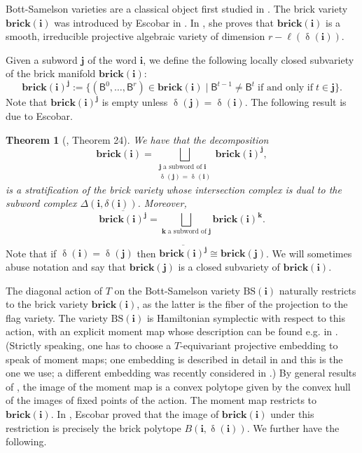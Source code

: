 \documentclass[a4paper, 11pt]{amsart}
\newcommand{\brick}{\mathbf{brick}}
\newcommand{\flag}[1]{\mathsf{B}^{#1}}
\newcommand{\word}[1]{\mathbf{#1}}
\DeclareMathOperator{\dem}{\delta}
\newcommand{\BS}{\mathrm{BS}}
\newtheorem{theorem}{Theorem}[section]
\theoremstyle{definition}
\begin{document}
Bott-Samelson varieties are a classical object first studied in \cite{BottSamelson}. The brick variety $\brick(\word{i})$ was introduced by Escobar in \cite[Definition 19]{escobar}. In \cite[Theorem 20]{escobar}, she proves that $\brick(\word{i})$ is a smooth, irreducible projective algebraic variety of dimension $r - \ell(\dem(\word{i}))$.

Given a subword $\word{j}$ of the word $\word{i}$, we define the following locally closed subvariety of the brick manifold $\brick(\word{i})$: 
\[
\brick(\word{i})^{\word{j}} := \{(\flag{0}, \dots, \flag{r}) \in \brick(\word{i}) \mid \flag{t-1} \neq \flag{t} \; \text{if and only if} \; t \in \word{j}\}. 
\]
Note that $\brick(\word{i})^{\word{j}}$ is empty unless $\dem(\word{j}) = \dem(\word{i})$. The following result is due to Escobar.

\begin{theorem}
[\cite{escobar}, Theorem 24]
\label{thm:escobar_stratification}
We have that the decomposition
\[
\brick(\word{i}) = \bigsqcup_{\substack{\word{j} \; \text{a subword of} \; \word{i} \\ \dem(\word{j}) = \dem(\word{i})}} \brick(\word{i})^{\word{j}},
\]
is a stratification of the brick variety whose intersection complex is dual to the subword complex $\Delta(\word{i},\delta(\word{i}))$.
Moreover,
\[
\overline{\brick(\word{i})^{\word{j}}} = \bigsqcup_{\word{k} \; \text{a subword of} \; \word{j}} \brick(\word{i})^{\word{k}}. 
\]
\end{theorem}

Note that if $\dem(\word{i}) = \dem(\word{j})$ then $\overline{\brick(\word{i})^{\word{j}}} \cong \brick(\word{j})$. We will sometimes abuse notation and say that $\brick(\word{j})$ is a closed subvariety of $\brick(\word{i})$. 

The diagonal action of $T$ on the Bott-Samelson variety $\BS(\word{i})$ naturally restricts to the brick variety $\brick(\word{i})$, as the latter is the fiber of the projection to the flag variety. The variety $\BS(\word{i})$ is Hamiltonian symplectic with respect to this action, with an explicit moment map whose description can be found e.g. in \cite{escobar}. (Strictly speaking, one has to choose a $T$-equivariant projective embedding to speak of moment maps; one embedding is described in detail in \cite[Section 4.1]{escobar} and this is the one we use; a different embedding was recently considered in \cite{GU}.) By general results of \cite{Atiyah, GuilleminSternbergI}, the image of the moment map is a convex polytope given by the convex hull of the images of fixed points of the action. The moment map restricts to $\brick(\word{i})$. In \cite[Theorem 21]{escobar}, Escobar proved that the image of  $\brick(\word{i})$ under this restriction is precisely the brick polytope $B(\word{i}, \dem(\word{i}))$. We further have the following.
\end{document}
